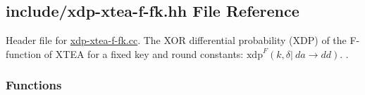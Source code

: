 \hypertarget{xdp-xtea-f-fk_8hh}{\subsection{include/xdp-\/xtea-\/f-\/fk.hh \-File \-Reference}
\label{xdp-xtea-f-fk_8hh}
}


\-Header file for \hyperlink{xdp-xtea-f-fk_8cc}{xdp-\/xtea-\/f-\/fk.\-cc}. \-The \-X\-O\-R differential probability (\-X\-D\-P) of the \-F-\/function of \-X\-T\-E\-A for a fixed key and round constants\-: $\mathrm{xdp}^{F}(k, \delta |~ da \rightarrow dd)$. .  


\subsubsection*{\-Functions}
